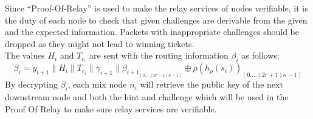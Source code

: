    Since “Proof-Of-Relay” is used to make the relay services of nodes verifiable, it is the duty of each node to check that given challenges are derivable from the given and the expected information.
Packets with inappropriate challenges should be dropped as they might not lead to winning tickets.
\\The values $H_i$ and $T_{c_i}$ are sent with the routing information $\beta_i$ as follows:
$$\beta_i=y_{i+1}\|H_i\|T_{c_i}\|\gamma_{i+1}\|\beta_{{i+1}_{[ \,0....(2r-1)\kappa-1\,] }}\oplus \rho(h_{\rho}(s_{i}))_{[ \,0....(2r+1)\kappa-1\,]}$$
By decrypting $\beta_i$, each mix node $n_i$ will retrieve the public key of the next downstream node and both the hint and challenge which will be used in the Proof Of Relay to make sure relay services are verifiable.

\begin{comment}
 \begin{figure}[H]
    \centering
    \begin{tabular}{| m{2em} | m{15em} | m{2em} |}
        \hline
        $\alpha$ & $\beta$                   & $\gamma$ \\
                 & \begin{tabular}{| c m{2em} | m{3em} | m{6em} |}
            \hline
            \multicolumn{2}{| c |}{$Y_B$} & $hint_B$                 & $challenge_{BC}$ \\
            \hline
            \multicolumn{2}{| c |}{$Y_C$} & $hint_C$                 & $random$         \\
            \hline
            \multicolumn{2}{| c |}{$Y_D$} & $hint_D$                 & $random$         \\
            \hline
            End                           & \multicolumn{3}{| l |}{}                    \\
            \hline
        \end{tabular} &          \\[3em]
        \hline
    \end{tabular}
    \caption{Sphinx with PoR}
    \label{fig:Sphinx with PoR}
\end{figure}
\end{comment}
